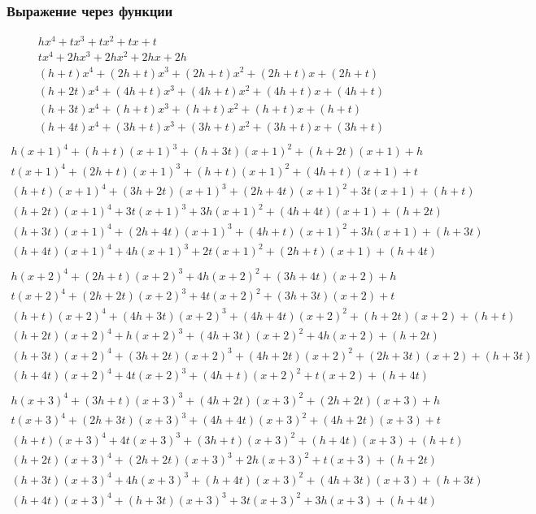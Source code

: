 \documentclass[bibliography=totoc, a4paper, 12pt]{extarticle}
\begin{document}
\subsubsection{Выражение через функции}
$$\begin{array}{l}
hx^4 + tx^3 + tx^2 + tx + t\\
tx^4 + 2hx^3 + 2hx^2 + 2hx + 2h\\
(h + t)x^4 + (2h + t)x^3 + (2h + t)x^2 + (2h + t)x + (2h + t)\\
(h + 2t)x^4 + (4h + t)x^3 + (4h + t)x^2 + (4h + t)x + (4h + t)\\
(h + 3t)x^4 + (h + t)x^3 + (h + t)x^2 + (h + t)x + (h + t)\\
(h + 4t)x^4 + (3h + t)x^3 + (3h + t)x^2 + (3h + t)x + (3h + t)\\
\end{array}$$
$$\begin{array}{l}
h(x+1)^4 + (h + t)(x+1)^3 + (h + 3t)(x+1)^2 + (h + 2t)(x+1) + h\\
t(x+1)^4 + (2h + t)(x+1)^3 + (h + t)(x+1)^2 + (4h + t)(x+1) + t\\
(h + t)(x+1)^4 + (3h + 2t)(x+1)^3 + (2h + 4t)(x+1)^2 + 3t(x+1) + (h + t)\\
(h + 2t)(x+1)^4 + 3t(x+1)^3 + 3h(x+1)^2 + (4h + 4t)(x+1) + (h + 2t)\\
(h + 3t)(x+1)^4 + (2h + 4t)(x+1)^3 + (4h + t)(x+1)^2 + 3h(x+1) + (h + 3t)\\
(h + 4t)(x+1)^4 + 4h(x+1)^3 + 2t(x+1)^2 + (2h + t)(x+1) + (h + 4t)\\
\end{array}$$
$$\begin{array}{l}
h(x+2)^4 + (2h + t)(x+2)^3 + 4h(x+2)^2 + (3h + 4t)(x+2) + h\\
t(x+2)^4 + (2h + 2t)(x+2)^3 + 4t(x+2)^2 + (3h + 3t)(x+2) + t\\
(h + t)(x+2)^4 + (4h + 3t)(x+2)^3 + (4h + 4t)(x+2)^2 + (h + 2t)(x+2) + (h + t)\\
(h + 2t)(x+2)^4 + h(x+2)^3 + (4h + 3t)(x+2)^2 + 4h(x+2) + (h + 2t)\\
(h + 3t)(x+2)^4 + (3h + 2t)(x+2)^3 + (4h + 2t)(x+2)^2 + (2h + 3t)(x+2) +
(h + 3t)\\
(h + 4t)(x+2)^4 + 4t(x+2)^3 + (4h + t)(x+2)^2 + t(x+2) + (h + 4t)\\
\end{array}$$
$$\begin{array}{l}
h(x+3)^4 + (3h + t)(x+3)^3 + (4h + 2t)(x+3)^2 + (2h + 2t)(x+3) + h\\
t(x+3)^4 + (2h + 3t)(x+3)^3 + (4h + 4t)(x+3)^2 + (4h + 2t)(x+3) + t\\
(h + t)(x+3)^4 + 4t(x+3)^3 + (3h + t)(x+3)^2 + (h + 4t)(x+3) + (h + t)\\
(h + 2t)(x+3)^4 + (2h + 2t)(x+3)^3 + 2h(x+3)^2 + t(x+3) + (h + 2t)\\
(h + 3t)(x+3)^4 + 4h(x+3)^3 + (h + 4t)(x+3)^2 + (4h + 3t)(x+3) + (h + 3t)\\
(h + 4t)(x+3)^4 + (h + 3t)(x+3)^3 + 3t(x+3)^2 + 3h(x+3) + (h + 4t)\\
\end{array}$$
\end{document}
